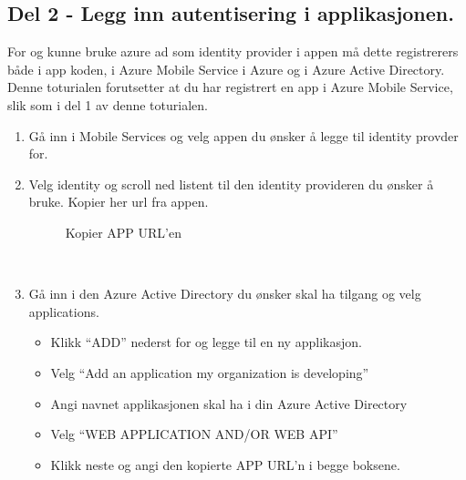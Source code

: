 \subsection{Del 2 - Legg inn autentisering i applikasjonen.}
\label{subsec:veiledninger_androidBrukerveliedning_del2-LeggInnAutentiseringIApplikasjonen}
For og kunne bruke azure ad som identity provider i appen må dette registrerers både i app koden, i Azure Mobile Service i Azure og i Azure Active Directory. Denne toturialen forutsetter at du har registrert en app i Azure Mobile Service, slik som i del 1 av denne toturialen.
\\
\begin{enumerate}
\item Gå inn i Mobile Services og velg appen du ønsker å legge til identity provder for. 
\\
\item Velg identity og scroll ned listent til den identity provideren du ønsker å bruke. Kopier her url fra appen. 
\\
\begin{figure}[H]
    \centering
    \setlength{\fboxsep}{0pt}%
    \setlength{\fboxrule}{1pt}%
    \caption{Kopier APP URL'en}
\end{figure}
\\
\item Gå inn i den Azure Active Directory du ønsker skal ha tilgang og velg applications.
\\
\begin{itemize}
\item Klikk “ADD” nederst for og legge til en ny applikasjon.
\item Velg “Add an application my organization is developing”
\item Angi navnet applikasjonen skal ha i din Azure Active Directory
\item Velg “WEB APPLICATION AND/OR WEB API”
\item Klikk neste og angi den kopierte APP URL’n i begge boksene. 
\end{itemize}
\bigskip




\end{enumerate}
